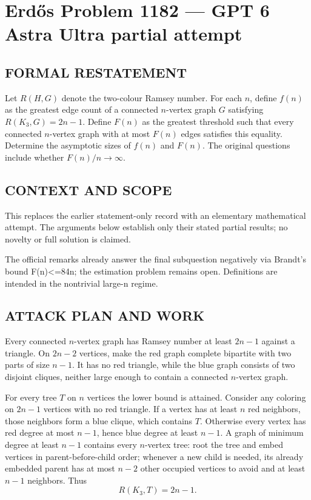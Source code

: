 \section*{Erd\H{o}s Problem 1182 --- GPT 6 Astra Ultra partial attempt}


\subsection*{FORMAL RESTATEMENT}
Let $R(H,G)$ denote the two-colour Ramsey number. For each $n$, define $f(n)$ as the greatest edge count of a connected $n$-vertex graph $G$ satisfying $R(K_3,G)=2n-1$. Define $F(n)$ as the greatest threshold such that every connected $n$-vertex graph with at most $F(n)$ edges satisfies this equality. Determine the asymptotic sizes of $f(n)$ and $F(n)$. The original questions include whether $F(n)/n\to\infty$.

\subsection*{CONTEXT AND SCOPE}
This replaces the earlier statement-only record with an elementary mathematical attempt. The arguments below establish only their stated partial results; no novelty or full solution is claimed.

The official remarks already answer the final subquestion negatively via Brandt's bound F(n)<=84n; the estimation problem remains open. Definitions are intended in the nontrivial large-n regime.

\subsection*{ATTACK PLAN AND WORK}
Every connected $n$-vertex graph has Ramsey number at least $2n-1$ against a
triangle. On $2n-2$ vertices, make the red graph complete bipartite with two
parts of size $n-1$. It has no red triangle, while the blue graph consists of
two disjoint cliques, neither large enough to contain a connected $n$-vertex graph.

For every tree $T$ on $n$ vertices the lower bound is attained. Consider any
coloring on $2n-1$ vertices with no red triangle. If a vertex has at least $n$
red neighbors, those neighbors form a blue clique, which contains $T$.
Otherwise every vertex has red degree at most $n-1$, hence blue degree at least
$n-1$. A graph of minimum degree at least $n-1$ contains every $n$-vertex tree:
root the tree and embed vertices in parent-before-child order; whenever a new
child is needed, its already embedded parent has at most $n-2$ other occupied
vertices to avoid and at least $n-1$ neighbors.
Thus
\[R(K_3,T)=2n-1.\tag{1}\]

